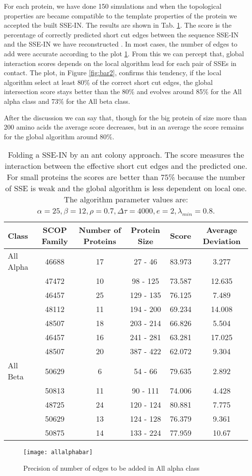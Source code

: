 For each protein, we have done 150 simulations and when the topological properties are became compatible to the template properties of the protein we accepted the built SSE-IN. The results are shown in Tab. \ref{tab:result}. The score is the percentage of correctly predicted short cut edges between the sequence SSE-IN and the SSE-IN we have reconstructed \cite{gaci2010}. In most cases, the number of edges to add were accurate according to the plot \ref{fig:bar1}. From this we can percept that, global interaction scores depends on the local algorithm lead for each pair of SSEs in contact. The plot, in Figure \ref{fig:bar2}, confirms this tendency, if the local algorithm select at least 80\% of the correct short cut edges, the global intersection score stays better than the 80\% and evolves around 85\% for the All alpha class and 73\% for the All beta class. 

After the discussion we can say that, though for the big protein of size more than 200 amino acids the average score decreases, but in an average the score remains for the global algorithm around 80\%.

\begin{table}
\centering
\begin{tabular}{l c c c c c}
\hline
Class & SCOP Family & Number of Proteins & Protein Size & Score & Average Deviation \\ \hline
All Alpha & 46688 & 17 & 27 - 46 & 83.973 & 3.277 \\
     & 47472 & 10 & 98 - 125 & 73.587 & 12.635 \\
	 & 46457 & 25 & 129 - 135 & 76.125 & 7.489 \\
	 & 48112 & 11 & 194 - 200 & 69.234 & 14.008 \\
	 & 48507 & 18 & 203 - 214 & 66.826 & 5.504 \\
	 & 46457 & 16 & 241 - 281 & 63.281 & 17.025 \\
	 & 48507 & 20 & 387 - 422 & 62.072 & 9.304 \\
\hline
All Beta & 50629 & 6 & 54 - 66 & 79.635 &  2.892 \\
		 & 50813 & 11 & 90 - 111 & 74.006 & 4.428 \\
		 & 48725 & 24 & 120 - 124 & 80.881 & 7.775 \\
		 & 50629 & 13 & 124 - 128 & 76.379 & 9.361 \\
		 & 50875 & 14 & 133 - 224 & 77.959 & 10.67 \\
\hline
\end{tabular}
\caption{Folding a SSE-IN by an ant colony approach. The score measures the interaction between the effective short cut edges and the predicted one. For small proteins the scores are better than 75\% because the number of SSE is weak and the global algorithm is less dependent on local one. The algorithm parameter values are: $\alpha = 25, \beta = 12, \rho = 0.7, \Delta\tau=4000, e = 2, \lambda_{min}=0.8$.}
\label{tab:result}
\end{table}
\begin{figure}[h]
\centering
\texttt{[image: allalphabar]}
\caption{Precision of number of edges to be added in All alpha class}
\label{fig:bar1}
\end{figure}

